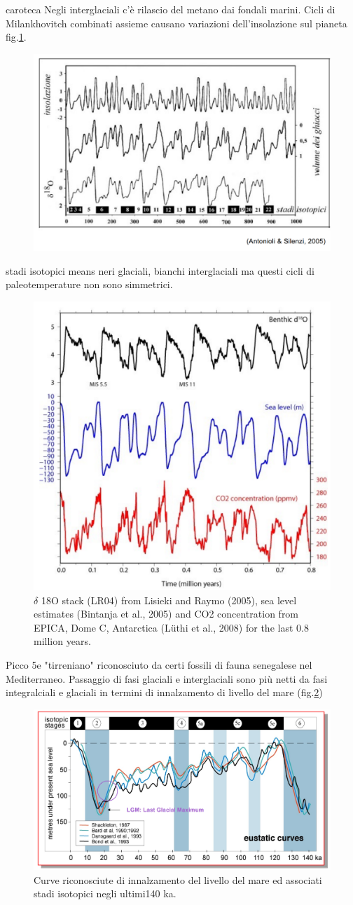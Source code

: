 caroteca
Negli interglaciali c'è rilascio del metano dai fondali marini. Cicli di Milankhovitch combinati assieme causano variazioni dell'insolazione sul pianeta fig.\ref{fig:insolazione}. 
\begin{figure}[htpb]
    \centering
    \includegraphics[width=0.5\linewidth]{uploads/insolazione.png}
    \label{fig:insolazione}
\end{figure}
stadi isotopici means neri glaciali, bianchi interglaciali ma questi cicli di paleotemperature non sono simmetrici. 
\begin{figure}[htpb]
    \centering
    \includegraphics[width=0.5\linewidth]{uploads/graph.png}
    \caption{$\delta$ 18O stack (LR04) from Lisieki and Raymo (2005), sea level estimates (Bintanja et al., 2005) and CO2
concentration from EPICA, Dome C, Antarctica (Lüthi et al., 2008) for the last 0.8 million years.}
\end{figure}
Picco 5e "tirreniano" riconosciuto da certi fossili di fauna senegalese nel Mediterraneo. Passaggio di fasi glaciali e interglaciali sono più netti da fasi integralciali e glaciali in termini di innalzamento di livello del mare (fig.\ref{fig:livelli mare})
\begin{figure}[htpb]
    \centering
    \includegraphics[width=0.5\linewidth]{uploads/livelli.png}
    \caption{Curve riconosciute di innalzamento del livello del mare ed associati stadi isotopici negli ultimi140 ka.}
    \label{fig:livelli mare}
\end{figure}

